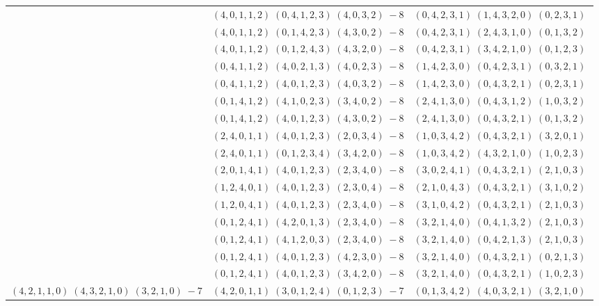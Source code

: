 \documentclass[11pt]{article}
\begin{document}
\begin{longtable}[l]{|c|c|c|}
 \cline{2-3} 
 & $(4 ,0 ,1 ,1 ,2) \;(0 ,4 ,1 ,2 ,3) \;(4 ,0 ,3 ,2) \;-8$ & $(0 ,4 ,2 ,3 ,1) \;(1 ,4 ,3 ,2 ,0) \;(0 ,2 ,3 ,1) \;$\\ 
 \cline{2-3} 
 & $(4 ,0 ,1 ,1 ,2) \;(0 ,1 ,4 ,2 ,3) \;(4 ,3 ,0 ,2) \;-8$ & $(0 ,4 ,2 ,3 ,1) \;(2 ,4 ,3 ,1 ,0) \;(0 ,1 ,3 ,2) \;$\\ 
 \cline{2-3} 
 & $(4 ,0 ,1 ,1 ,2) \;(0 ,1 ,2 ,4 ,3) \;(4 ,3 ,2 ,0) \;-8$ & $(0 ,4 ,2 ,3 ,1) \;(3 ,4 ,2 ,1 ,0) \;(0 ,1 ,2 ,3) \;$\\ 
 \cline{2-3} 
 & $(0 ,4 ,1 ,1 ,2) \;(4 ,0 ,2 ,1 ,3) \;(4 ,0 ,2 ,3) \;-8$ & $(1 ,4 ,2 ,3 ,0) \;(0 ,4 ,2 ,3 ,1) \;(0 ,3 ,2 ,1) \;$\\ 
 \cline{2-3} 
 & $(0 ,4 ,1 ,1 ,2) \;(4 ,0 ,1 ,2 ,3) \;(4 ,0 ,3 ,2) \;-8$ & $(1 ,4 ,2 ,3 ,0) \;(0 ,4 ,3 ,2 ,1) \;(0 ,2 ,3 ,1) \;$\\ 
 \cline{2-3} 
 & $(0 ,1 ,4 ,1 ,2) \;(4 ,1 ,0 ,2 ,3) \;(3 ,4 ,0 ,2) \;-8$ & $(2 ,4 ,1 ,3 ,0) \;(0 ,4 ,3 ,1 ,2) \;(1 ,0 ,3 ,2) \;$\\ 
 \cline{2-3} 
 & $(0 ,1 ,4 ,1 ,2) \;(4 ,0 ,1 ,2 ,3) \;(4 ,3 ,0 ,2) \;-8$ & $(2 ,4 ,1 ,3 ,0) \;(0 ,4 ,3 ,2 ,1) \;(0 ,1 ,3 ,2) \;$\\ 
 \cline{2-3} 
 & $(2 ,4 ,0 ,1 ,1) \;(4 ,0 ,1 ,2 ,3) \;(2 ,0 ,3 ,4) \;-8$ & $(1 ,0 ,3 ,4 ,2) \;(0 ,4 ,3 ,2 ,1) \;(3 ,2 ,0 ,1) \;$\\ 
 \cline{2-3} 
 & $(2 ,4 ,0 ,1 ,1) \;(0 ,1 ,2 ,3 ,4) \;(3 ,4 ,2 ,0) \;-8$ & $(1 ,0 ,3 ,4 ,2) \;(4 ,3 ,2 ,1 ,0) \;(1 ,0 ,2 ,3) \;$\\ 
 \cline{2-3} 
 & $(2 ,0 ,1 ,4 ,1) \;(4 ,0 ,1 ,2 ,3) \;(2 ,3 ,4 ,0) \;-8$ & $(3 ,0 ,2 ,4 ,1) \;(0 ,4 ,3 ,2 ,1) \;(2 ,1 ,0 ,3) \;$\\ 
 \cline{2-3} 
 & $(1 ,2 ,4 ,0 ,1) \;(4 ,0 ,1 ,2 ,3) \;(2 ,3 ,0 ,4) \;-8$ & $(2 ,1 ,0 ,4 ,3) \;(0 ,4 ,3 ,2 ,1) \;(3 ,1 ,0 ,2) \;$\\ 
 \cline{2-3} 
 & $(1 ,2 ,0 ,4 ,1) \;(4 ,0 ,1 ,2 ,3) \;(2 ,3 ,4 ,0) \;-8$ & $(3 ,1 ,0 ,4 ,2) \;(0 ,4 ,3 ,2 ,1) \;(2 ,1 ,0 ,3) \;$\\ 
 \cline{2-3} 
 & $(0 ,1 ,2 ,4 ,1) \;(4 ,2 ,0 ,1 ,3) \;(2 ,3 ,4 ,0) \;-8$ & $(3 ,2 ,1 ,4 ,0) \;(0 ,4 ,1 ,3 ,2) \;(2 ,1 ,0 ,3) \;$\\ 
 \cline{2-3} 
 & $(0 ,1 ,2 ,4 ,1) \;(4 ,1 ,2 ,0 ,3) \;(2 ,3 ,4 ,0) \;-8$ & $(3 ,2 ,1 ,4 ,0) \;(0 ,4 ,2 ,1 ,3) \;(2 ,1 ,0 ,3) \;$\\ 
 \cline{2-3} 
 & $(0 ,1 ,2 ,4 ,1) \;(4 ,0 ,1 ,2 ,3) \;(4 ,2 ,3 ,0) \;-8$ & $(3 ,2 ,1 ,4 ,0) \;(0 ,4 ,3 ,2 ,1) \;(0 ,2 ,1 ,3) \;$\\ 
 \cline{2-3} 
 & $(0 ,1 ,2 ,4 ,1) \;(4 ,0 ,1 ,2 ,3) \;(3 ,4 ,2 ,0) \;-8$ & $(3 ,2 ,1 ,4 ,0) \;(0 ,4 ,3 ,2 ,1) \;(1 ,0 ,2 ,3) \;$\\ \hline\multirow[t]{54}{*}{ $(4 ,2 ,1 ,1 ,0) \;(4 ,3 ,2 ,1 ,0) \;(3 ,2 ,1 ,0) \;-7$ }  & $(4 ,2 ,0 ,1 ,1) \;(3 ,0 ,1 ,2 ,4) \;(0 ,1 ,2 ,3) \;-7$ & $(0 ,1 ,3 ,4 ,2) \;(4 ,0 ,3 ,2 ,1) \;(3 ,2 ,1 ,0) \;$\\ 

\end{longtable}
\end{document}
